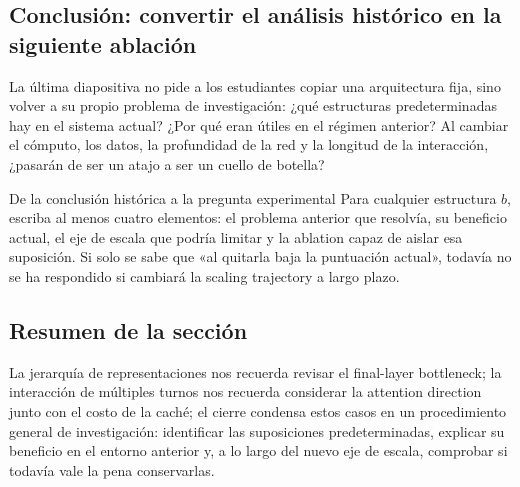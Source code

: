 

\subsection{Conclusión: convertir el análisis histórico en la siguiente ablación}

La última diapositiva no pide a los estudiantes copiar una arquitectura fija, sino volver a su propio problema de investigación: ¿qué estructuras predeterminadas hay en el sistema actual? ¿Por qué eran útiles en el régimen anterior? Al cambiar el cómputo, los datos, la profundidad de la red y la longitud de la interacción, ¿pasarán de ser un atajo a ser un cuello de botella?



\begin{importantbox}{De la conclusión histórica a la pregunta experimental}
Para cualquier estructura $b$, escriba al menos cuatro elementos: el problema anterior que resolvía, su beneficio actual, el eje de escala que podría limitar y la ablation capaz de aislar esa suposición. Si solo se sabe que «al quitarla baja la puntuación actual», todavía no se ha respondido si cambiará la scaling trajectory a largo plazo.
\end{importantbox}

\subsection{Resumen de la sección}

La jerarquía de representaciones nos recuerda revisar el final-layer bottleneck; la interacción de múltiples turnos nos recuerda considerar la attention direction junto con el costo de la caché; el cierre condensa estos casos en un procedimiento general de investigación: identificar las suposiciones predeterminadas, explicar su beneficio en el entorno anterior y, a lo largo del nuevo eje de escala, comprobar si todavía vale la pena conservarlas.
